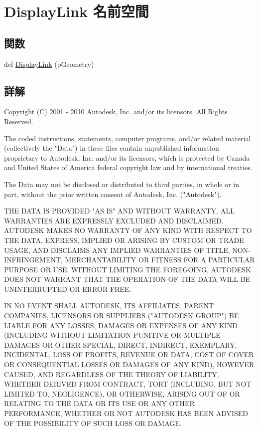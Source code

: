 \hypertarget{namespace_display_link}{}\section{Display\+Link 名前空間}
\label{namespace_display_link}
\subsection*{関数}
\begin{DoxyCompactItemize}
\item 
def \hyperlink{namespace_display_link_af46b3c09f8eb4c76ceb6fd791e735a5c}{Display\+Link} (p\+Geometry)
\end{DoxyCompactItemize}


\subsection{詳解}
\begin{DoxyVerb} Copyright (C) 2001 - 2010 Autodesk, Inc. and/or its licensors.
 All Rights Reserved.

 The coded instructions, statements, computer programs, and/or related material 
 (collectively the "Data") in these files contain unpublished information 
 proprietary to Autodesk, Inc. and/or its licensors, which is protected by 
 Canada and United States of America federal copyright law and by international 
 treaties. 
 
 The Data may not be disclosed or distributed to third parties, in whole or in
 part, without the prior written consent of Autodesk, Inc. ("Autodesk").

 THE DATA IS PROVIDED "AS IS" AND WITHOUT WARRANTY.
 ALL WARRANTIES ARE EXPRESSLY EXCLUDED AND DISCLAIMED. AUTODESK MAKES NO
 WARRANTY OF ANY KIND WITH RESPECT TO THE DATA, EXPRESS, IMPLIED OR ARISING
 BY CUSTOM OR TRADE USAGE, AND DISCLAIMS ANY IMPLIED WARRANTIES OF TITLE, 
 NON-INFRINGEMENT, MERCHANTABILITY OR FITNESS FOR A PARTICULAR PURPOSE OR USE. 
 WITHOUT LIMITING THE FOREGOING, AUTODESK DOES NOT WARRANT THAT THE OPERATION
 OF THE DATA WILL BE UNINTERRUPTED OR ERROR FREE. 
 
 IN NO EVENT SHALL AUTODESK, ITS AFFILIATES, PARENT COMPANIES, LICENSORS
 OR SUPPLIERS ("AUTODESK GROUP") BE LIABLE FOR ANY LOSSES, DAMAGES OR EXPENSES
 OF ANY KIND (INCLUDING WITHOUT LIMITATION PUNITIVE OR MULTIPLE DAMAGES OR OTHER
 SPECIAL, DIRECT, INDIRECT, EXEMPLARY, INCIDENTAL, LOSS OF PROFITS, REVENUE
 OR DATA, COST OF COVER OR CONSEQUENTIAL LOSSES OR DAMAGES OF ANY KIND),
 HOWEVER CAUSED, AND REGARDLESS OF THE THEORY OF LIABILITY, WHETHER DERIVED
 FROM CONTRACT, TORT (INCLUDING, BUT NOT LIMITED TO, NEGLIGENCE), OR OTHERWISE,
 ARISING OUT OF OR RELATING TO THE DATA OR ITS USE OR ANY OTHER PERFORMANCE,
 WHETHER OR NOT AUTODESK HAS BEEN ADVISED OF THE POSSIBILITY OF SUCH LOSS
 OR DAMAGE. \end{DoxyVerb}
 

